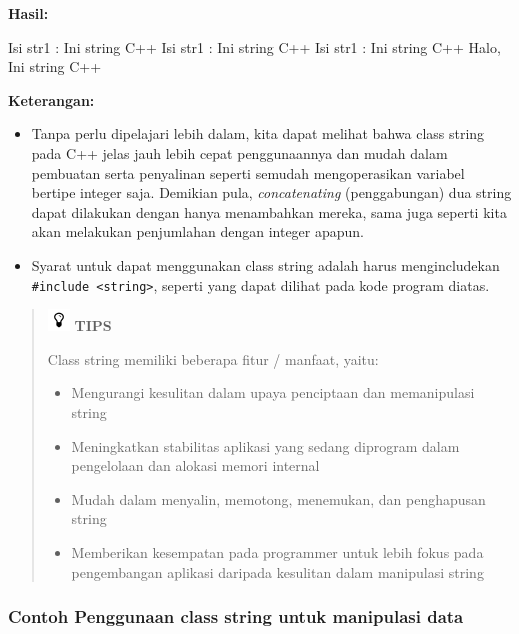 \textbf{Hasil:}

\begin{lcverbatim}
Isi str1 : Ini string C++
Isi str1 : Ini string C++
Isi str1 : Ini string C++
Halo, Ini string C++
\end{lcverbatim}

\textbf{Keterangan:}

\begin{itemize}

\item
  Tanpa perlu dipelajari lebih dalam, kita dapat melihat bahwa class
  string pada C++ jelas jauh lebih cepat penggunaannya dan mudah dalam
  pembuatan serta penyalinan seperti semudah mengoperasikan variabel
  bertipe integer saja. Demikian pula, \emph{concatenating}
  (penggabungan) dua string dapat dilakukan dengan hanya menambahkan
  mereka, sama juga seperti kita akan melakukan penjumlahan dengan
  integer apapun.
\item
  Syarat untuk dapat menggunakan class string adalah harus
  mengincludekan \texttt{\#include\ \textless{}string\textgreater{}},
  seperti yang dapat dilihat pada kode program diatas.
\end{itemize}
\begin{quotation}
\includegraphics{../manuscript/images/tips.png} \textbf{TIPS} 
 
 Class
 string memiliki beberapa fitur / manfaat, yaitu: 
\begin{itemize}
\item Mengurangi kesulitan dalam upaya penciptaan dan
memanipulasi string
\item Meningkatkan stabilitas aplikasi
yang sedang diprogram dalam pengelolaan dan alokasi memori internal
\item Mudah dalam menyalin, memotong, menemukan, dan
penghapusan string
\item Memberikan kesempatan pada
programmer untuk lebih fokus pada pengembangan aplikasi daripada
kesulitan dalam manipulasi string
\end{itemize} 
 
\end{quotation}


\subsubsection*{Contoh  Penggunaan class string untuk manipulasi data}


